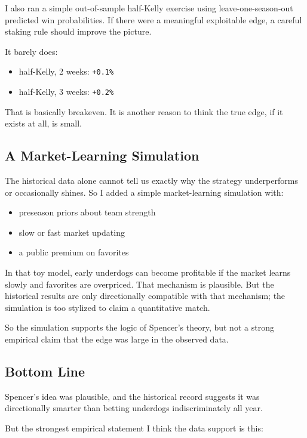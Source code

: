 \documentclass[
  letterpaper,
  DIV=11,
  numbers=noendperiod]{scrartcl}
\providecommand{\tightlist}{%
  \setlength{\itemsep}{0pt}\setlength{\parskip}{0pt}}\usepackage{longtable,booktabs,array}
\begin{document}
I also ran a simple out-of-sample half-Kelly exercise using
leave-one-season-out predicted win probabilities. If there were a
meaningful exploitable edge, a careful staking rule should improve the
picture.

It barely does:

\begin{itemize}
\tightlist
\item
  half-Kelly, 2 weeks: \texttt{+0.1\%}
\item
  half-Kelly, 3 weeks: \texttt{+0.2\%}
\end{itemize}

That is basically breakeven. It is another reason to think the true
edge, if it exists at all, is small.

\subsection{A Market-Learning
Simulation}\label{a-market-learning-simulation}

The historical data alone cannot tell us exactly why the strategy
underperforms or occasionally shines. So I added a simple
market-learning simulation with:

\begin{itemize}
\tightlist
\item
  preseason priors about team strength
\item
  slow or fast market updating
\item
  a public premium on favorites
\end{itemize}

In that toy model, early underdogs can become profitable if the market
learns slowly and favorites are overpriced. That mechanism is plausible.
But the historical results are only directionally compatible with that
mechanism; the simulation is too stylized to claim a quantitative match.

So the simulation supports the logic of Spencer's theory, but not a
strong empirical claim that the edge was large in the observed data.

\subsection{Bottom Line}\label{bottom-line}

Spencer's idea was plausible, and the historical record suggests it was
directionally smarter than betting underdogs indiscriminately all year.

But the strongest empirical statement I think the data support is this:
\end{document}
